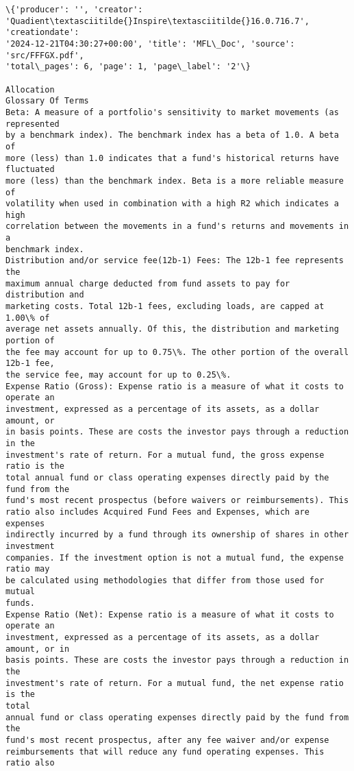 \documentclass[11pt]{article}
\begin{document}
    \begin{Verbatim}[commandchars=\\\{\}]
\{'producer': '', 'creator': 'Quadient\textasciitilde{}Inspire\textasciitilde{}16.0.716.7', 'creationdate':
'2024-12-21T04:30:27+00:00', 'title': 'MFL\_Doc', 'source': 'src/FFFGX.pdf',
'total\_pages': 6, 'page': 1, 'page\_label': '2'\}

Allocation
Glossary Of Terms
Beta: A measure of a portfolio's sensitivity to market movements (as represented
by a benchmark index). The benchmark index has a beta of 1.0. A beta of
more (less) than 1.0 indicates that a fund's historical returns have fluctuated
more (less) than the benchmark index. Beta is a more reliable measure of
volatility when used in combination with a high R2 which indicates a high
correlation between the movements in a fund's returns and movements in a
benchmark index.
Distribution and/or service fee(12b-1) Fees: The 12b-1 fee represents the
maximum annual charge deducted from fund assets to pay for distribution and
marketing costs. Total 12b-1 fees, excluding loads, are capped at 1.00\% of
average net assets annually. Of this, the distribution and marketing portion of
the fee may account for up to 0.75\%. The other portion of the overall 12b-1 fee,
the service fee, may account for up to 0.25\%.
Expense Ratio (Gross): Expense ratio is a measure of what it costs to operate an
investment, expressed as a percentage of its assets, as a dollar amount, or
in basis points. These are costs the investor pays through a reduction in the
investment's rate of return. For a mutual fund, the gross expense ratio is the
total annual fund or class operating expenses directly paid by the fund from the
fund's most recent prospectus (before waivers or reimbursements). This
ratio also includes Acquired Fund Fees and Expenses, which are expenses
indirectly incurred by a fund through its ownership of shares in other
investment
companies. If the investment option is not a mutual fund, the expense ratio may
be calculated using methodologies that differ from those used for mutual
funds.
Expense Ratio (Net): Expense ratio is a measure of what it costs to operate an
investment, expressed as a percentage of its assets, as a dollar amount, or in
basis points. These are costs the investor pays through a reduction in the
investment's rate of return. For a mutual fund, the net expense ratio is the
total
annual fund or class operating expenses directly paid by the fund from the
fund's most recent prospectus, after any fee waiver and/or expense
reimbursements that will reduce any fund operating expenses. This ratio also

\end{Verbatim}
\end{document}
